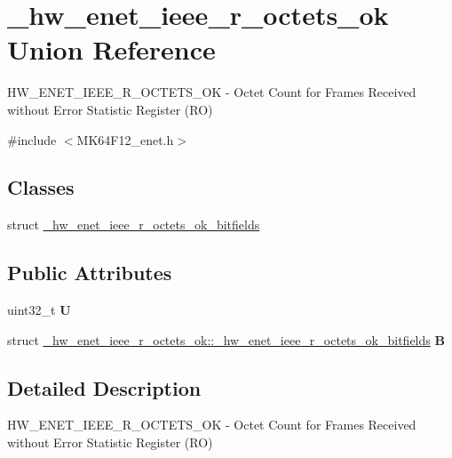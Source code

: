 \hypertarget{union__hw__enet__ieee__r__octets__ok}{}\section{\+\_\+hw\+\_\+enet\+\_\+ieee\+\_\+r\+\_\+octets\+\_\+ok Union Reference}
\label{union__hw__enet__ieee__r__octets__ok}


H\+W\+\_\+\+E\+N\+E\+T\+\_\+\+I\+E\+E\+E\+\_\+\+R\+\_\+\+O\+C\+T\+E\+T\+S\+\_\+\+OK -\/ Octet Count for Frames Received without Error Statistic Register (RO)  




{\ttfamily \#include $<$M\+K64\+F12\+\_\+enet.\+h$>$}

\subsection*{Classes}
\begin{DoxyCompactItemize}
\item 
struct \hyperlink{struct__hw__enet__ieee__r__octets__ok_1_1__hw__enet__ieee__r__octets__ok__bitfields}{\+\_\+hw\+\_\+enet\+\_\+ieee\+\_\+r\+\_\+octets\+\_\+ok\+\_\+bitfields}
\end{DoxyCompactItemize}
\subsection*{Public Attributes}
\begin{DoxyCompactItemize}
\item 
uint32\+\_\+t {\bfseries U}\hypertarget{union__hw__enet__ieee__r__octets__ok_ab850c4e2523c00760042f4469983f7f0}{}\label{union__hw__enet__ieee__r__octets__ok_ab850c4e2523c00760042f4469983f7f0}

\item 
struct \hyperlink{struct__hw__enet__ieee__r__octets__ok_1_1__hw__enet__ieee__r__octets__ok__bitfields}{\+\_\+hw\+\_\+enet\+\_\+ieee\+\_\+r\+\_\+octets\+\_\+ok\+::\+\_\+hw\+\_\+enet\+\_\+ieee\+\_\+r\+\_\+octets\+\_\+ok\+\_\+bitfields} {\bfseries B}\hypertarget{union__hw__enet__ieee__r__octets__ok_a270e52236ffd87e01a43ef7aeca305a2}{}\label{union__hw__enet__ieee__r__octets__ok_a270e52236ffd87e01a43ef7aeca305a2}

\end{DoxyCompactItemize}


\subsection{Detailed Description}
H\+W\+\_\+\+E\+N\+E\+T\+\_\+\+I\+E\+E\+E\+\_\+\+R\+\_\+\+O\+C\+T\+E\+T\+S\+\_\+\+OK -\/ Octet Count for Frames Received without Error Statistic Register (RO) 

